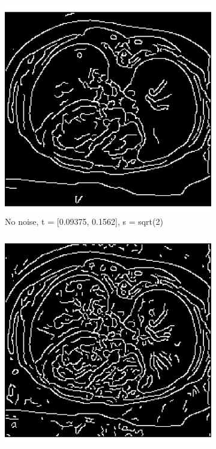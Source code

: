 \begin{figure}[H]
  \centering
  
  \begin{subfigure}{.5\textwidth}
    \centering
    \includegraphics[width=.9\textwidth]{./canny1/no_noise_t_009375_01562}
    \caption{No noise, t = [0.09375, 0.1562], s = sqrt(2)}
    \label{fig:cany_no_noise_high_low_t}
  \end{subfigure}%
  \begin{subfigure}{.5\textwidth}
    \centering
    \includegraphics[width=.9\textwidth]{./canny1/no_noise_t_00625_00781}

\end{subfigure}
\end{figure}
